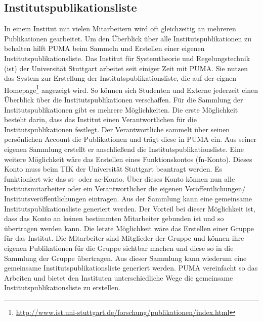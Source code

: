 \subsection{Institutspublikationsliste}
In einem Institut mit vielen Mitarbeitern wird oft gleichzeitig an mehreren Publikationen gearbeitet. Um den Überblick über alle Institutspublikationen zu behalten hilft PUMA beim Sammeln und Erstellen einer eigenen Institutspublikationsliste. \newline
Das Institut für Systemtheorie und Regelungstechnik (ist) der Universität Stuttgart arbeitet seit einiger Zeit mit PUMA. Sie nutzen das System zur Erstellung der Institutspublikationsliste, die auf der eignen Homepage\footnote{\url{http://www.ist.uni-stuttgart.de/forschung/publikationen/index.html}} angezeigt wird. So können sich Studenten und Externe jederzeit einen Überblick über die Institutspublikationen verschaffen.\newline
Für die Sammlung der Institutspublikationen gibt es mehrere Möglichkeiten. Die erste Möglichkeit besteht darin, dass das Institut einen Verantwortlichen für  die Institutspublikationen festlegt. Der Verantwortliche sammelt über seinen persönlichen Account die Publikationen und trägt diese in PUMA ein. Aus seiner eigenen Sammlung erstellt er anschließend die Institutspublikationsliste. Eine weitere Möglichkeit wäre das Erstellen eines Funktionskontos (fn-Konto). Dieses Konto muss beim TIK der Universität Stuttgart beantragt werden. Es funktioniert wie das st- oder ac-Konto. Über dieses Konto können nun alle Institutsmitarbeiter oder ein Verantwortlicher die eigenen Veröffentlichungen/ Institutsveröffentlichungen eintragen. Aus der Sammlung kann eine gemeinsame Institutspublikationsliste generiert werden. Der Vorteil bei dieser Möglichkeit ist, dass das Konto an keinen bestimmten Mitarbeiter gebunden ist und so übertragen werden kann. Die letzte Möglichkeit wäre das Erstellen einer Gruppe für das Institut. Die Mitarbeiter sind Mitglieder der Gruppe und können ihre eigenen Publikationen für die Gruppe sichtbar machen und diese so in die Sammlung der Gruppe übertragen. Aus dieser  Sammlung kann wiederum eine gemeinsame Institutspublikationsliste generiert werden.\newline
PUMA vereinfacht so das Arbeiten und bietet den Instituten unterschiedliche Wege die gemeinsame Institutspublikationsliste zu erstellen.